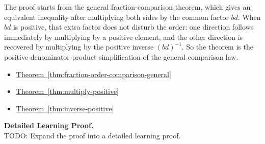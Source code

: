 \begin{remark*}
The proof starts from the general fraction-comparison theorem, which gives an
equivalent inequality after multiplying both sides by the common factor $bd$.
When $bd$ is positive, that extra factor does not disturb the order: one
direction follows immediately by multiplying by a positive element, and the
other direction is recovered by multiplying by the positive inverse
$(bd)^{-1}$.  So the theorem is the positive-denominator-product simplification
of the general comparison law.
\end{remark*}

\begin{dependencies}
\begin{itemize}
  \item \hyperref[thm:fraction-order-comparison-general]{Theorem~\ref*{thm:fraction-order-comparison-general}}
  \item \hyperref[thm:multiply-positive]{Theorem~\ref*{thm:multiply-positive}}
  \item \hyperref[thm:inverse-positive]{Theorem~\ref*{thm:inverse-positive}}
\end{itemize}
\end{dependencies}

\textbf{Detailed Learning Proof.}~\\
TODO: Expand the proof into a detailed learning proof.

